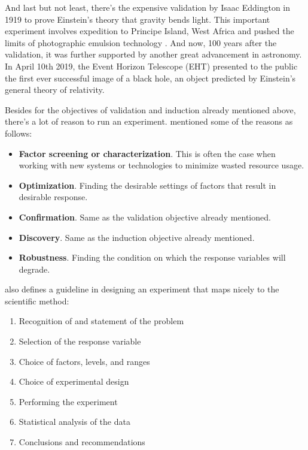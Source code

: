 And last but not least, there's the expensive validation by Isaac Eddington in 1919 to prove Einstein's theory that gravity bends light.
This important experiment involves expedition to Principe Island, West Africa and pushed the limits of photographic emulsion technology \citep{tichyShouldComputerScientists1998}.
And now, 100 years after the validation, it was further supported by another great advancement in astronomy.
In April 10th 2019, the Event Horizon Telescope (EHT) presented to the public the first ever successful image of a black hole, an object predicted by Einstein's general theory of relativity.

Besides for the objectives of validation and induction already mentioned above, there's a lot of reason to run an experiment.
\citet{montgomeryDesignAnalysisExperiments2013} mentioned some of the reasons as follows:
\begin {itemize}[noitemsep]
	\item \textbf{Factor screening or characterization}. This is often the case when working with new systems or technologies to minimize wasted resource usage.
	\item \textbf{Optimization}. Finding the desirable settings of factors that result in desirable response.
	\item \textbf{Confirmation}. Same as the validation objective already mentioned.
	\item \textbf{Discovery}. Same as the induction objective already mentioned.
	\item \textbf{Robustness}. Finding the condition on which the response variables will degrade.
\end{itemize}

\citet{montgomeryDesignAnalysisExperiments2013} also defines a guideline in designing an experiment that maps nicely to the scientific method:

\begin{enumerate}[noitemsep]
	\item Recognition of and statement of the problem
	\item Selection of the response variable
	\item Choice of factors, levels, and ranges
	\item Choice of experimental design
	\item Performing the experiment
	\item Statistical analysis of the data
	\item Conclusions and recommendations
\end{enumerate}

